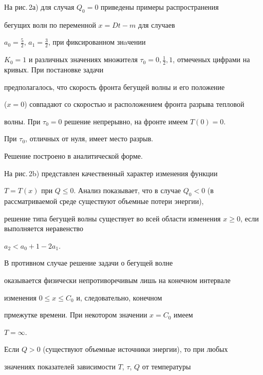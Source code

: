 \medskip





На рис.\,2а) для случая $Q_{0}=0$ приведены примеры распространения 


бегущих волн по переменной $x = Dt - m$ для случаев


$a_{0} = \frac {5}{2}$, $a_1 = \frac {3}{2}$, при фиксированном знaчении


$K_{0}=1$ и различных значениях множителя $\tau _{0} =0, \frac


{1}{2}, 1$, отмеченых цифрами на кривых. При постановке задачи


предполагалось, что скорость фронта бегущей волны и его положение


($x=0$) совпадают со скоростью и расположением фронта разрыва тепловой 


волны. При $\tau _{0} =0$ решение непрерывно, на фронте имеем $T(0) = 0$.


При $\tau _{0}$, отличных от нуля, имеет место разрыв.


Решение построено в аналитической форме.





На рис.\,2b) представлен качественный характер изменения функции


$T{=}T(x)$ при $Q \leq 0$. Анализ показывает, что в случае $Q_{0} <


0$ (в рассматриваемой среде существуют объемные потери энергии),


решение типа бегущей волны существует во всей области изменения $x


\geq 0$, если выполняется неравенство


$a_{2} < a_{0} + 1 - 2a_{1}$.


В противном случае решение задачи о бегущей волне


оказывается физически непротиворечивым лишь на конечном интервале


изменения $0\leq x \leq C_{0}$ и, следовательно, конечном


прмежутке времени. При некотором значении $x=C_{0}$ имеем


$T=\infty$.





Если $Q>0$ (существуют объемные источники энергии), то при любых


значениях показателей зависимости $T$, $\tau$, $Q$ от температуры


